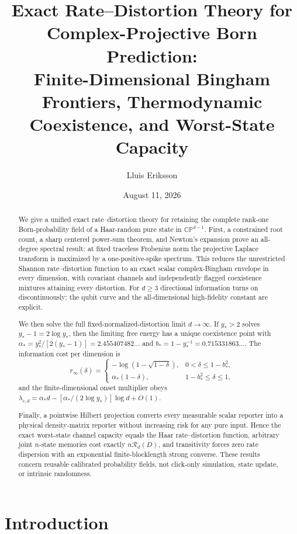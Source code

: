 \documentclass[11pt,a4paper]{article}
\title{\bfseries Exact Rate--Distortion Theory for Complex-Projective Born Prediction:\\
Finite-Dimensional Bingham Frontiers, Thermodynamic Coexistence, and Worst-State Capacity}
\author{Lluis Eriksson}
\date{August 11, 2026}
\theoremstyle{remark}
\newcommand{\cR}{\mathcal{R}}
\begin{document}
\maketitle

\begin{abstract}
We give a unified exact rate--distortion theory for retaining the complete
rank-one Born-probability field of a Haar-random pure state in
$\mathbb{CP}^{d-1}$.  First, a constrained root count, a sharp centered
power-sum theorem, and Newton's expansion prove an all-degree spectral result:
at fixed traceless Frobenius norm the projective Laplace transform is maximized
by a one-positive-spike spectrum.  This reduces the unrestricted Shannon
rate--distortion function to an exact scalar complex-Bingham envelope in every
dimension, with covariant channels and independently flagged coexistence
mixtures attaining every distortion.  For $d\ge3$ directional information
turns on discontinuously; the qubit curve and the all-dimensional
high-fidelity constant are explicit.

We then solve the full fixed-normalized-distortion limit $d\to\infty$.  If
$y_*>2$ solves $y_*-1=2\log y_*$, then the limiting free energy has a unique
coexistence point with
$\alpha_*=y_*^2/[2(y_*-1)]=2.455407482\ldots$ and
$b_*=1-y_*^{-1}=0.715331863\ldots$.  The information cost per dimension is
\[
 r_\infty(\delta)=
 \begin{cases}
 -\log(1-\sqrt{1-\delta}),&0<\delta\le1-b_*^2,\\
 \alpha_*(1-\delta),&1-b_*^2\le\delta\le1,
 \end{cases}
\]
and the finite-dimensional onset multiplier obeys
$\lambda_{c,d}=\alpha_*d-[\alpha_*/(2\log y_*)]\log d+O(1)$.

Finally, a pointwise Hilbert projection converts every measurable scalar
reporter into a physical density-matrix reporter without increasing risk for
any pure input.  Hence the exact worst-state channel capacity equals the Haar
rate--distortion function, arbitrary joint $n$-state memories cost exactly
$n\cR_d(D)$, and transitivity forces zero rate dispersion with an exponential
finite-blocklength strong converse.  These results concern reusable calibrated
probability fields, not click-only simulation, state update, or intrinsic
randomness.
\end{abstract}

\section{Introduction}
\end{document}
